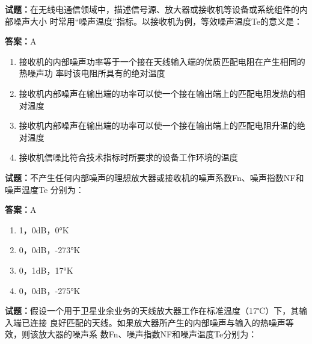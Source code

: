 \documentclass{ctexbook}
\begin{document}
\vspace{1em}

\textbf{试题：}在无线电通信领域中，描述信号源、放大器或接收机等设备或系统组件的内部噪声大小
时常用“噪声温度”指标。以接收机为例，等效噪声温度Te的意义是： 

\textbf{答案：}A 

\begin{enumerate}[leftmargin=3em]
  \item 接收机的内部噪声功率等于一个接在天线输入端的优质匹配电阻在产生相同的热噪声功
率时该电阻所具有的绝对温度 

  \item 接收机内部噪声在输出端的功率可以使一个接在输出端上的匹配电阻发热的相对温度 

  \item 接收机内部噪声在输出端的功率可以使一个接在输出端上的匹配电阻升温的绝对温度 

  \item 接收机信噪比符合技术指标时所要求的设备工作环境的温度 

\end{enumerate}





\vspace{1em}

\textbf{试题：}不产生任何内部噪声的理想放大器或接收机的噪声系数Fn、噪声指数NF和噪声温度Te
分别为： 

\textbf{答案：}A 

\begin{enumerate}[leftmargin=3em]
  \item 1，0dB，0°K 

  \item 0，0dB，-273°K 

  \item 0，1dB，17°K 

  \item 0，0dB，-275°K 

\end{enumerate}






\vspace{1em}

\textbf{试题：}假设一个用于卫星业余业务的天线放大器工作在标准温度（17℃）下，其输入端已连接
良好匹配的天线。如果放大器所产生的内部噪声与输入的热噪声等效，则该放大器的噪声系
数Fn、噪声指数NF和噪声温度Te分别为： 
\end{document}

